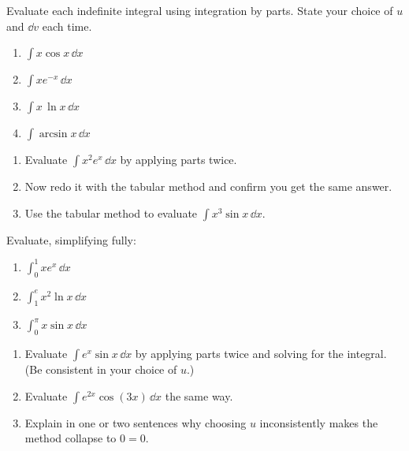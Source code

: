 \begin{exercise}
\label{ch23:exr-warmup}
Evaluate each indefinite integral using integration by parts. State your choice of
$u$ and $\dd v$ each time.
\begin{enumerate}[label=(\alph*)]
\item $\displaystyle\int x\cos x\,\dd x$
\item $\displaystyle\int x e^{-x}\,\dd x$
\item $\displaystyle\int x\,\ln x\,\dd x$
\item $\displaystyle\int \arcsin x\,\dd x$
\end{enumerate}
\end{exercise}

\begin{exercise}
\label{ch23:exr-tworounds}
\begin{enumerate}[label=(\alph*)]
\item Evaluate $\displaystyle\int x^2 e^{x}\,\dd x$ by applying parts twice.
\item Now redo it with the tabular method and confirm you get the same answer.
\item Use the tabular method to evaluate $\displaystyle\int x^3\sin x\,\dd x$.
\end{enumerate}
\end{exercise}

\begin{exercise}
\label{ch23:exr-definite}
Evaluate, simplifying fully:
\begin{enumerate}[label=(\alph*)]
\item $\displaystyle\int_0^1 x e^{x}\,\dd x$
\item $\displaystyle\int_1^{e} x^2\ln x\,\dd x$
\item $\displaystyle\int_0^{\pi} x\sin x\,\dd x$
\end{enumerate}
\end{exercise}

\begin{exercise}
\label{ch23:exr-recurring}
\begin{enumerate}[label=(\alph*)]
\item Evaluate $\displaystyle\int e^{x}\sin x\,\dd x$ by applying parts twice and
solving for the integral. (Be consistent in your choice of $u$.)
\item Evaluate $\displaystyle\int e^{2x}\cos(3x)\,\dd x$ the same way.
\item Explain in one or two sentences why choosing $u$ inconsistently makes the
method collapse to $0=0$.
\end{enumerate}
\end{exercise}

